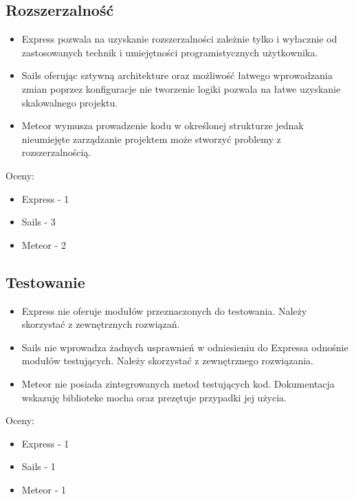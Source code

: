 \documentclass[12pt]{report}
\begin{document}
    \subsection{Rozszerzalność}
      \begin{itemize}
        \item Express pozwala na uzyskanie rozszerzalności zależnie tylko i wyłacznie od zastosowanych technik i umiejętności programistycznych użytkownika.
        \item Sails oferując sztywną architekture oraz możliwość łatwego wprowadzania zmian poprzez konfiguracje nie tworzenie logiki pozwala na łatwe uzyskanie skalowalnego projektu.
        \item Meteor wymusza prowadzenie kodu w określonej strukturze jednak nieumiejęte zarządzanie projektem może stworzyć problemy z rozszerzalnością.
      \end{itemize}
      Oceny:
      \begin{itemize}
        \item Express - 1
        \item Sails - 3
        \item Meteor - 2
      \end{itemize}

    \subsection{Testowanie}
      \begin{itemize}
        \item Express nie oferuje modułów przeznaczonych do testowania. Należy skorzystać z zewnętrznych rozwiązań.
        \item Sails nie wprowadza żadnych usprawnień w odniesieniu do Expressa odnośnie modułów testujących. Należy skorzystać z zewnętrznego rozwiązania.
        \item Meteor nie posiada zintegrowanych metod testujących kod. Dokumentacja wskazuję biblioteke mocha oraz prezętuje przypadki jej użycia.
      \end{itemize}
      Oceny:
      \begin{itemize}
        \item Express - 1
        \item Sails - 1
        \item Meteor - 1
      \end{itemize}
      
\end{document}
